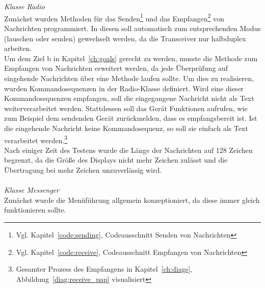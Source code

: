\documentclass[a4paper, 11pt]{scrartcl}
\begin{document}
\\
\\
\textit{Klasse Radio}
\\
Zunächst wurden Methoden für das Senden\footnote{Vgl. Kapitel~\ref{code:sending}, Codeausschnitt \glqq Senden von Nachrichten\grqq{}} und das
Empfangen\footnote{Vgl. Kapitel~\ref{code:receive}, Codeausschnitt \glqq Empfangen von Nachrichten\grqq{}} von Nachrichten programmiert. In diesen
soll automatisch zum entsprechenden Modus (lauschen oder senden) gewechselt werden, da die Transceiver nur halbduplex arbeiten.
\\
Um dem Ziel b in Kapitel~\ref{ch:goals} gerecht zu werden, musste die Methode zum Empfangen von Nachrichten erweitert werden, da jede Überprüfung auf
eingehende Nachrichten über eine Methode laufen sollte. Um dies zu realisieren, wurden Kommandosequenzen in der Radio-Klasse definiert. Wird eine dieser
Kommandosequenzen empfangen, soll die eingegangene Nachricht nicht als Text weiterverarbeitet werden. Stattdessen soll das Gerät Funktionen 
aufrufen, wie zum Beispiel dem sendenden Gerät zurückmelden, dass es empfangsbereit ist. Ist die eingehende Nachricht keine Kommandosequenz,
so soll sie einfach als Text verarbeitet werden.\footnote{Gesamter Prozess des Empfangens in Kapitel~\ref{ch:diags}, Abbildung~\ref{diag:receive_pap} visualisiert}
\\
Nach einiger Zeit des Testens wurde die Länge der Nachrichten auf 128 Zeichen begrenzt, da die Größe des Displays nicht mehr Zeichen zulässt und die Übertragung
bei mehr Zeichen unzuverlässig wird.
\\
\\
\textit{Klasse Messenger}
\\
Zunächst wurde die Menüführung allgemein konzeptioniert, da diese immer gleich funktionieren sollte. 
\end{document}

